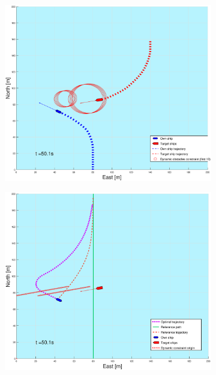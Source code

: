 \begin{figure}[ht!]
\begin{subfigure}[b]{0.499\textwidth}
    \end{subfigure}
    \hfill
    \\
    \begin{subfigure}[b]{0.49\textwidth}
        \centering
        \includegraphics[width=\textwidth]{Images/Figures/sving_GW/_Simple_1fig1_time=50}
    \end{subfigure}
    \hfill
    \begin{subfigure}[b]{0.499\textwidth}
        \centering
        \includegraphics[width=\textwidth]{Images/Figures/sving_GW/_Simple_1fig999_time=50}

\end{subfigure}
\end{figure}
